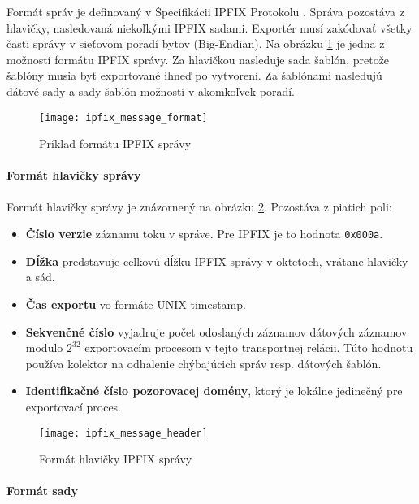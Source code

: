 Formát správ je definovaný v Špecifikácii IPFIX Protokolu \citep{rfc5101}. Správa pozostáva z 
hlavičky, nasledovaná niekoľkými IPFIX sadami. 
Exportér musí zakódovať všetky časti správy v sieťovom poradí bytov (Big-Endian).
Na obrázku \ref{o:ipfix_message_format} je jedna z možností formátu IPFIX správy. Za hlavičkou nasleduje sada šablón, pretože
šablóny musia byť exportované ihneď po vytvorení. Za šablónami nasledujú dátové sady a sady šablón možností 
v akomkoľvek poradí.

\begin{figure}[ht!]
\centering
\texttt{[image: ipfix\_message\_format]}
\caption{Príklad formátu IPFIX správy}\label{o:ipfix_message_format}
\end{figure}

\paragraph{Formát hlavičky správy}

Formát hlavičky správy je znázornený na obrázku \ref{o:ipfix_message_header}. Pozostáva z piatich poli:
\begin{itemize}
 \item \textbf{Číslo verzie} záznamu toku v správe. Pre IPFIX je to hodnota \verb|0x000a|.
 \item \textbf{Dĺžka} predstavuje celkovú dĺžku IPFIX správy v oktetoch, vrátane hlavičky a sád. 
 \item \textbf{Čas exportu} vo formáte UNIX timestamp. 
 \item \textbf{Sekvenčné číslo} vyjadruje počet odoslaných záznamov dátových záznamov modulo $2^{32}$  
 exportovacím procesom v tejto transportnej relácii. Túto hodnotu používa kolektor na odhalenie chýbajúcich 
 správ resp. dátových šablón.
 \item \textbf{Identifikačné číslo pozorovacej domény}, ktorý je lokálne jedinečný pre exportovací proces.
 \end{itemize}
 
\begin{figure}[ht!]
\centering
\texttt{[image: ipfix\_message\_header]}
\caption{Formát hlavičky IPFIX správy}\label{o:ipfix_message_header}
\end{figure}

\paragraph{Formát sady}

